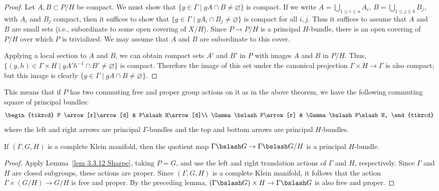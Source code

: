 \begin{proof}
    Let $A,B\subset P\slash H$ be compact. We must show that $\{g\in\Gamma\mid gA\cap B\neq \varnothing\}$ is compact. If we write $A=\bigcup_{1\leq i\leq a}A_i$, $B=\bigcup_{1\leq j\leq b}B_j$, with $A_i$ and $B_j$ compact, then it suffices to show that $\{g\in\Gamma\mid gA_i\cap B_j\neq\varnothing\}$ is compact for all $i,j$. Thus it suffices to assume that $A$ and $B$ are small sets (i.e., subordinate to some open covering of $X\slash H$). Since $P\to P\slash H$ is a principal $H$-bundle, there is an open covering of $P\slash H$ over which $P$ is trivialized. We may assume that $A$ and $B$ are subordinate to this cover.

    Applying a local section to $A$ and $B$, we can obtain compact sets $A'$ and $B'$ in $P$ with images $A$ and $B$ in $P\slash H$. Thus, $\{(g,h)\in\Gamma\times H\mid gA' h^{-1}\cap B'\neq \varnothing\}$ is compact. Therefore the image of this set under the canonical projection $\Gamma\times H\to \Gamma$ is also compact; but this image is clearly $\{g\in\Gamma\mid gA\cap B\neq \varnothing\}$.
\end{proof}


This means that if $P$ has two commuting free and proper group actions on it as in the above theorem, we have the following commuting square of principal bundles:
\[\begin{tikzcd}
    P \arrow[r]\arrow[d] & P\slash H\arrow[d]\\
    \Gamma\bslash P\arrow[r] & \Gamma\bslash P\slash H,
\end{tikzcd}\]
where the left and right arrows are principal $\Gamma$-bundles and the top and bottom arrows are principal $H$-bundles.


\begin{cor}
    If $(\Gamma,G,H)$ is a complete Klein manifold, then the quotient map $\Gamma\bslash G\to \Gamma\bslash G\slash H$ is a principal $H$-bundle.
\end{cor}
\begin{proof}
    Apply Lemma~\ref{lem 3.3.12 Sharpe}, taking $P=G$, and use the left and right translation actions of $\Gamma$ and $H$, respectively. Since $\Gamma$ and $H$ are closed subgroups, these actions are proper. Since $(\Gamma,G,H)$ is a complete Klein manifold, it follows that the action $\Gamma\times(G\slash H)\to G\slash H$ is free and proper. By the preceding lemma, $(\Gamma\bslash G)\times H\to \Gamma\bslash G$ is also free and proper.
\end{proof}

